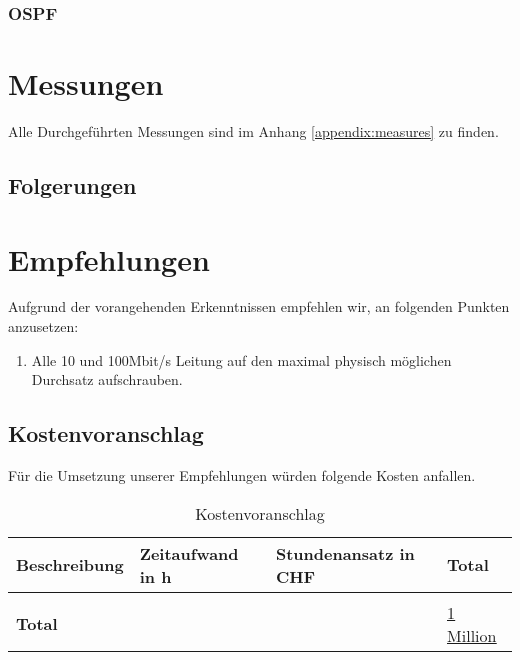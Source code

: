\subsubsection{OSPF}


\section{Messungen}
Alle Durchgeführten Messungen sind im Anhang \ref{appendix:measures} zu finden.

\subsection{Folgerungen}




\section{Empfehlungen}
Aufgrund der vorangehenden Erkenntnissen empfehlen wir, an folgenden Punkten anzusetzen:
\begin{enumerate}
	\item Alle 10 und 100Mbit/s Leitung auf den maximal physisch möglichen Durchsatz aufschrauben.
\end{enumerate}

\subsection{Kostenvoranschlag}
Für die Umsetzung unserer Empfehlungen würden folgende Kosten anfallen.
\begin{table}[h]
	\centering
	\begin{tabu} to \linewidth {l l l l}
		\toprule 
		Beschreibung & Zeitaufwand in h  & Stundenansatz in CHF & Total \\
		\midrule
		&&& \\
		\textbf{Total} & & & \underline{\underline{1 Million}} \\
		\bottomrule 
	\end{tabu} 
	\caption{Kostenvoranschlag}
\end{table}


